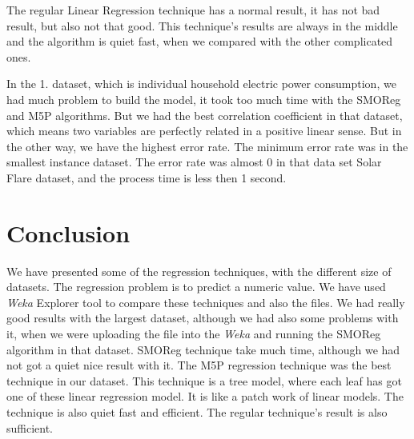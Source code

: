 \documentclass[a4paper]{article}
\begin{document}
The regular Linear Regression technique has a normal result, it has not bad result, but also not that good. This technique's results are always in the middle and the algorithm is quiet fast, when we compared with the other complicated ones.

In the 1. dataset, which is individual household electric power consumption, we had much problem to build the model, it took too much time with the SMOReg and M5P algorithms. But we had the best correlation coefficient in that dataset, which means two variables are perfectly related in a positive linear sense. But in the other way, we have the highest error rate. The minimum error rate was in the smallest instance dataset. The error rate was almost 0 in that data set Solar Flare dataset, and the process time is less then 1 second.


\section{Conclusion}

We have presented some of the regression techniques, with the different size of datasets. The regression problem is to predict a numeric value. We have used \emph{Weka} Explorer tool to compare these techniques and also the files. We had really good results with the largest dataset, although we had also some problems with it, when we were uploading the file into the \emph{Weka} and running the SMOReg algorithm in that dataset. SMOReg technique take much time, although we had not got a quiet nice result with it. The M5P regression technique was the best technique in our dataset. This technique is a tree model, where each leaf has got one of these linear regression model. It is like a patch work of linear models. The technique is also quiet fast and efficient. The regular technique's result is also sufficient. 
\end{document}
